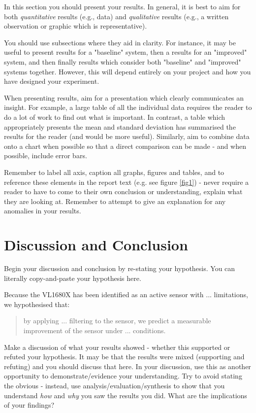 \documentclass[conference]{IEEEtran}
\begin{document}
In this section you should present your results.  In general, it is best to aim for both \emph{quantitative} results (e.g., data) and \emph{qualitative} results (e.g., a written observation or graphic which is representative).  

You should use subsections where they aid in clarity.  For instance, it may be useful to present results for a "baseline" system, then a results for an "improved" system, and then finally results which consider both "baseline" and "improved" systems together.  However, this will depend entirely on your project and how you have designed your experiment.

When presenting results, aim for a presentation which clearly communicates an insight. For example, a large table of all the individual data requires the reader to do a lot of work to find out what is important.  In contrast, a table which appropriately presents the mean and standard deviation has summarised the results for the reader (and would be more useful).  Similarly, aim to combine data onto a chart when possible so that a direct comparison can be made - and when possible, include error bars.  


Remember to label all axis, caption all graphs, figures and tables, and to reference these elements in the report text (e.g. see figure \ref{fig1}) - never require a reader to have to come to their own conclusion or understanding, explain what they are looking at.  Remember to attempt to give an explanation for any anomalies in your results.  


\section{Discussion and Conclusion}

Begin your discussion and conclusion by re-stating your hypothesis.  You can literally copy-and-paste your hypothesis here.  

Because the VL1680X has been identified as an active sensor with ... limitations, we hypothesised that:
\begin{quote}
    by applying ... filtering to the sensor, we predict a measurable improvement of the sensor under ... conditions.  
\end{quote}

Make a discussion of what your results showed - whether this supported or refuted your hypothesis.  It may be that the results were mixed (supporting and refuting) and you should discuss that here. In your discussion, use this as another opportunity to demonstrate/evidence your understanding. Try to avoid stating the obvious - instead, use analysis/evaluation/synthesis to show that you understand \emph{how} and \emph{why} you saw the results you did.  What are the implications of your findings?  
\end{document}
